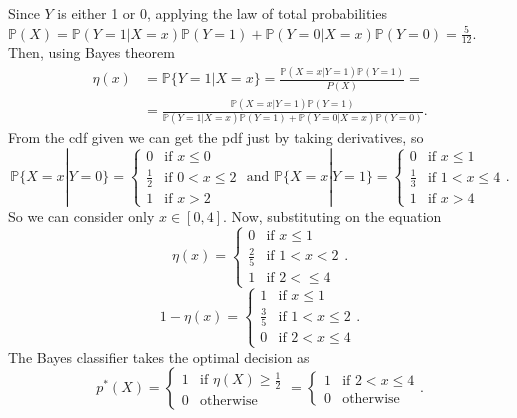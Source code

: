 \documentclass[11pt, english]{article}
\begin{document}
Since $Y$ is either 1 or 0, applying the law of total probabilities $\mathbb{P}(X)=\mathbb{P}(Y=1|X=x)\mathbb{P}(Y=1)+\mathbb{P}(Y=0|X=x)\mathbb{P}(Y=0)=\frac{5}{12}$. Then, using Bayes theorem \begin{align}
	\eta(x) & =\mathbb{P}\{Y=1|X=x\}=\frac{\mathbb{P}(X=x|Y=1)\mathbb{P}(Y=1)}{P(X)}=\\
	&=\frac{\mathbb{P}(X=x|Y=1)\mathbb{P}(Y=1)}{\mathbb{P}(Y=1|X=x)\mathbb{P}(Y=1)+\mathbb{P}(Y=0|X=x)\mathbb{P}(Y=0)}.
\end{align}
From the cdf given we can get the pdf just by taking derivatives, so
$$\mathbb{P}\{X= x|Y=0\}=\left\{\begin{array}{ll}
0 & \text{if }x\leq 0\\
\frac{1}{2} & \text{if } 0< x\leq 2\\
1 & \text{if } x>2
\end{array}\right.\text{ and }\mathbb{P}\{X= x|Y=1\}=\left\{\begin{array}{ll}
0 & \text{if } x\leq 1\\
\frac{1}{3} & \text{if } 1< x\leq 4\\
1 & \text{if } x>4
\end{array}\right..$$
So we can consider only $x\in[0,4]$. Now, substituting on the equation
\begin{equation}
	\eta(x)=\left\{\begin{array}{ll}
	0 & \text{if }x\leq 1\\
	\frac{2}{5} & \text{if } 1<x<2\\
	1 & \text{if } 2<\leq 4
	\end{array}\right..
\end{equation}
\begin{equation}
1-\eta(x)=\left\{\begin{array}{ll}
1 & \text{if }x\leq 1\\
\frac{3}{5} & \text{if } 1<x\leq2\\
0 & \text{if } 2<x\leq 4
\end{array}\right..
\end{equation}
The Bayes classifier takes the optimal decision as 
\begin{equation}
	p^*(X)=\left\{\begin{array}{ll}
	1 & \text{if } \eta(X)\geq \frac{1}{2}\\
	0 & \text{otherwise}
	\end{array}\right.=\left\{\begin{array}{ll}
	1 & \text{if } 2<x\leq 4\\
	0 & \text{otherwise}
	\end{array}\right..
\end{equation}
\end{document}
